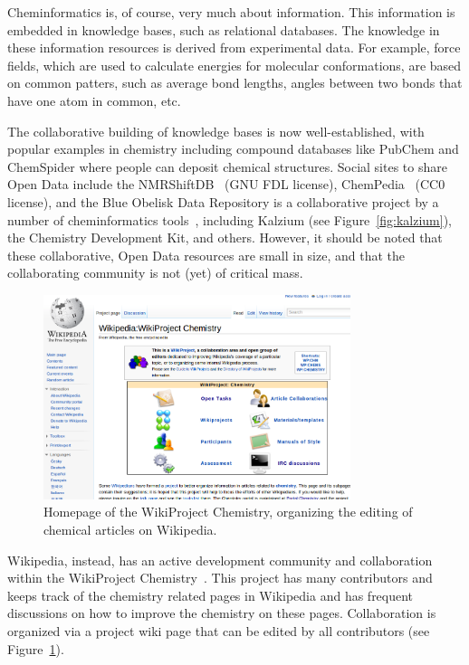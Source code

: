 \documentclass[11pt]{book}
\begin{document}
Cheminformatics is, of course, very much about information. This
information is embedded in knowledge bases, such as relational databases.
The knowledge in these information resources is derived from experimental
data. For example, force fields, which are used to calculate energies
for molecular conformations, are based on common patters, such as
average bond lengths, angles between two bonds that have one
atom in common, etc.

The collaborative building of knowledge bases is now well-established,
with popular examples in chemistry including compound databases
like PubChem and ChemSpider where people can deposit chemical
structures.
Social sites to share Open Data include the
NMRShiftDB~\cite{Steinbeck2004} (GNU FDL license),
ChemPedia~\cite{chempedia} (CC0 license),
and the Blue Obelisk Data Repository is a collaborative project by a number
of cheminformatics tools~\cite{Guha2006}, including Kalzium (see Figure~\ref{fig:kalzium}),
the Chemistry Development Kit, and others.
However, it should be noted that these collaborative, Open Data
resources are small in size, and that the collaborating community
is not (yet) of critical mass.

\begin{figure}[bt]
\begin{center}
\includegraphics[width=0.8\textwidth]{graphics/wikichemistry}
\end{center}
\caption{Homepage of the WikiProject Chemistry, organizing the
editing of chemical articles on Wikipedia.}
\label{fig:wikichem}
\end{figure}

Wikipedia, instead, has an active development community and
collaboration within the WikiProject Chemistry~\cite{wikichem}.
This project has many contributors and keeps track of the chemistry
related pages in Wikipedia and has frequent discussions on how
to improve the chemistry on these pages. Collaboration is organized
via a project wiki page that can be edited by all contributors
(see Figure~\ref{fig:wikichem}).
\end{document}
